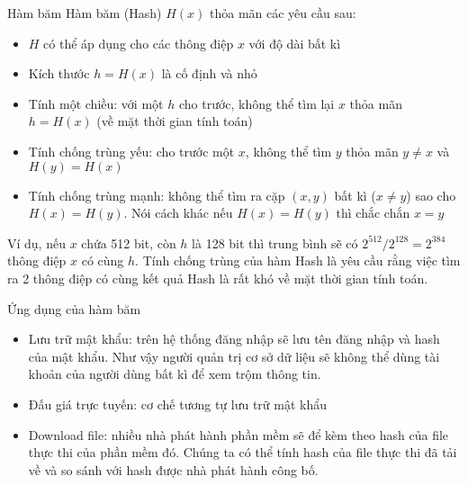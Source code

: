 \begin{frame}{Hàm băm}
Hàm băm (Hash) $H(x)$ thỏa mãn các yêu cầu sau:
\begin{itemize}
    \item $H$ có thể áp dụng cho các thông điệp $x$ với độ dài bất kì
    \item Kích thước $h=H(x)$ là cố định và nhỏ
    \item Tính một chiều: với một $h$ cho trước, không thể tìm lại $x$ thỏa mãn $h=H(x)$ (về mặt thời gian tính toán)
    \item Tính chống trùng yếu: cho trước một $x$, không thể tìm $y$ thỏa mãn $y \neq x$ và $H(y) = H(x)$
    \item Tính chống trùng mạnh: không thể tìm ra cặp $(x, y)$ bất kì ($x \neq y$) sao cho $H(x)=H(y)$. Nói cách khác nếu $H(x)=H(y)$ thì chắc chắn $x=y$
\end{itemize}

Ví dụ, nếu $x$ chứa 512 bit, còn $h$ là 128 bit thì trung bình sẽ có $2^{512}/2^{128}=2^{384}$ thông điệp $x$ có cùng $h$. Tính chống trùng của hàm Hash là yêu cầu rằng việc tìm ra 2 thông điệp có cùng kết quả Hash là rất khó về mặt thời gian tính toán.
\end{frame}
\begin{frame}{Ứng dụng của hàm băm}
\begin{itemize}
    \item Lưu trữ mật khẩu: trên hệ thống đăng nhập sẽ lưu tên đăng nhập và hash của mật khẩu. Như vậy người quản trị cơ sở dữ liệu sẽ không thể dùng tài khoản của người dùng bất kì để xem trộm thông tin. %
    \item Đấu giá trực tuyến: cơ chế tương tự lưu trữ mật khẩu
    \item Download file: nhiều nhà phát hành phần mềm sẽ để kèm theo hash của file thực thi của phần mềm đó. Chúng ta có thể tính hash của file thực thi đã tải về và so sánh với hash được nhà phát hành công bố. %
\end{itemize}
\end{frame}